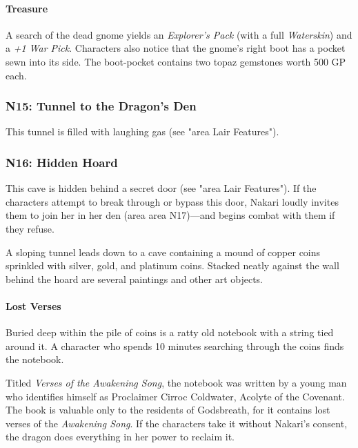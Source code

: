 \documentclass[letterpaper, 11pt, twocolumn]{dndbook}
\begin{document}
\paragraph{Treasure}

A search of the dead gnome yields an \textit{Explorer's Pack} (with a full \textit{Waterskin}) and a \textit{+1 War Pick}. Characters also notice that the gnome's right boot has a pocket sewn into its side. The boot-pocket contains two topaz gemstones worth 500 GP each.

\subsubsection{N15: Tunnel to the Dragon's Den}

This tunnel is filled with laughing gas (see "area Lair Features").

\subsubsection{N16: Hidden Hoard}

This cave is hidden behind a secret door (see "area Lair Features"). If the characters attempt to break through or bypass this door, Nakari loudly invites them to join her in her den (area area N17)---and begins combat with them if they refuse.

\begin{DndReadAloud}
A sloping tunnel leads down to a cave containing a mound of copper coins sprinkled with silver, gold, and platinum coins. Stacked neatly against the wall behind the hoard are several paintings and other art objects.
\end{DndReadAloud}

\paragraph{Lost Verses}

Buried deep within the pile of coins is a ratty old notebook with a string tied around it. A character who spends 10 minutes searching through the coins finds the notebook.

Titled \textit{Verses of the Awakening Song}, the notebook was written by a young man who identifies himself as Proclaimer Cirroc Coldwater, Acolyte of the Covenant. The book is valuable only to the residents of Godsbreath, for it contains lost verses of the \textit{Awakening Song}. If the characters take it without Nakari's consent, the dragon does everything in her power to reclaim it.
\end{document}

